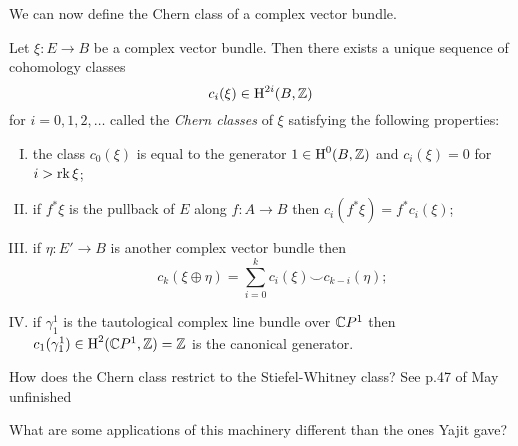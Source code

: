 \documentclass{amsart}
\begin{document}
We can now define the Chern class of a complex vector bundle.
\begin{theorem}
    Let $\xi:E\to B$ be a complex vector bundle. Then there exists a unique sequence of cohomology classes
    \begin{equation*}
        c_i(\xi) \in \operatorname{H}^{2i}(B, \mathbb{Z})
    \end{equation*}
    for $i=0,1,2,\ldots$ called the \textit{Chern classes} of $\xi$ satisfying the following
    properties:
    \begin{enumerate}[(I)]
        \item the class $c_0(\xi)$ is equal to the generator $1\in\operatorname{H}^0(B,\mathbb{Z})$ and $c_i(\xi)=0$ for $i>\operatorname{rk}\xi$;
        \item if $f^*\xi$ is the pullback of $E$ along $f:A\to B$ then $c_i(f^*\xi)=f^*c_i(\xi)$;
        \item if $\eta:E'\to B$ is another complex vector bundle then
            \begin{equation*}
                c_k(\xi\oplus \eta) = \sum_{i=0}^k c_i(\xi)\smile c_{k-i}(\eta);
            \end{equation*}
        \item if $\gamma_1^1$ is the tautological complex line bundle over $\mathbb{C} P^1$ then $c_1(\gamma_1^1)\in\operatorname{H}^2(\mathbb{C} P^1,\mathbb{Z})=\mathbb{Z}$
            is the canonical generator.
    \end{enumerate}
    \label{sw}
\end{theorem}

{\color{magenta} How does the Chern class restrict to the Stiefel-Whitney class? See p.47 of May unfinished}

{\color{magenta} What are some applications of this machinery different than the ones Yajit gave?}
\end{document}
